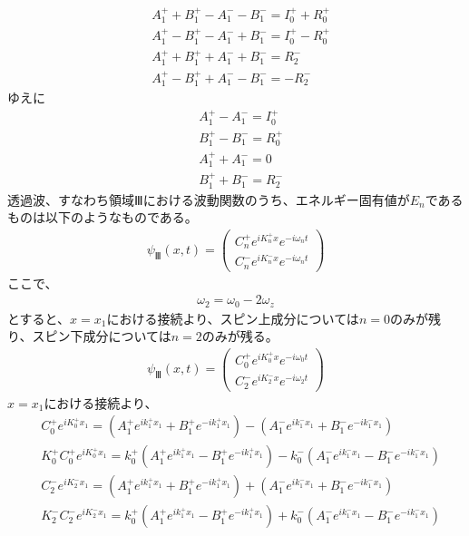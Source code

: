 \begin{align}
&A_{1}^{+}+B_{1}^{+}-A_{1}^{-}-B_{1}^{-}=I_{0}^{+}+R_{0}^{+} \\
&A_{1}^{+}-B_{1}^{+}-A_{1}^{-}+B_{1}^{-}=I_{0}^{+}-R_{0}^{+} \\
&A_{1}^{+}+B_{1}^{+}+A_{1}^{-}+B_{1}^{-}=R_{2}^{-} \\
&A_{1}^{+}-B_{1}^{+}+A_{1}^{-}-B_{1}^{-}=-R_{2}^{-}
\end{align}
ゆえに
\begin{align}
&A_{1}^{+}-A_{1}^{-}=I_{0}^{+} \\
&B_{1}^{+}-B_{1}^{-}=R_{0}^{+} \\
&A_{1}^{+}+A_{1}^{-}=0 \\
&B_{1}^{+}+B_{1}^{-}=R_{2}^{-}
\end{align}
透過波、すなわち領域Ⅲにおける波動関数のうち、エネルギー固有値が$E_{n}$であるものは以下のようなものである。
\begin{align}
{\psi}_{Ⅲ}(x,t)=
\begin{pmatrix}
C_{n}^{+}e^{iK_{n}^{+}x}e^{-i\omega_{n}t} \\
C_{n}^{-}e^{iK_{n}^{-}x}e^{-i\omega_{n}t} 
\end{pmatrix}
\end{align}
ここで、
\begin{align}
\omega_{2}=\omega_{0}-2\omega_{z}
\end{align}
とすると、$x=x_{1}$における接続より、スピン上成分については$n=0$のみが残り、スピン下成分については$n=2$のみが残る。
\begin{align}
{\psi}_{Ⅲ}(x,t)=
\begin{pmatrix}
C_{0}^{+}e^{iK_{0}^{+}x}e^{-i\omega_{0}t} \\
C_{2}^{-}e^{iK_{2}^{-}x}e^{-i\omega_{2}t} 
\end{pmatrix}
\end{align}
$x=x_{1}$における接続より、
\begin{align}
&C_{0}^{+}e^{iK_{0}^{+}x_{1}}=(A_{1}^{+}e^{ik_{1}^{+}x_{1}}+B_{1}^{+}e^{-ik_{1}^{+}x_{1}})-(A_{1}^{-}e^{ik_{1}^{-}x_{1}}+B_{1}^{-}e^{-ik_{1}^{-}x_{1}}) \\
&K_{0}^{+}C_{0}^{+}e^{iK_{0}^{+}x_{1}}=k_{0}^{+}(A_{1}^{+}e^{ik_{1}^{+}x_{1}}-B_{1}^{+}e^{-ik_{1}^{+}x_{1}})-k_{0}^{-}(A_{1}^{-}e^{ik_{1}^{-}x_{1}}-B_{1}^{-}e^{-ik_{1}^{-}x_{1}}) \\
&C_{2}^{-}e^{iK_{2}^{-}x_{1}}=(A_{1}^{+}e^{ik_{1}^{+}x_{1}}+B_{1}^{+}e^{-ik_{1}^{+}x_{1}})+(A_{1}^{-}e^{ik_{1}^{-}x_{1}}+B_{1}^{-}e^{-ik_{1}^{-}x_{1}}) \\
&K_{2}^{-}C_{2}^{-}e^{iK_{2}^{-}x_{1}}=k_{0}^{+}(A_{1}^{+}e^{ik_{1}^{+}x_{1}}-B_{1}^{+}e^{-ik_{1}^{+}x_{1}})+k_{0}^{-}(A_{1}^{-}e^{ik_{1}^{-}x_{1}}-B_{1}^{-}e^{-ik_{1}^{-}x_{1}}) 
\end{align}
